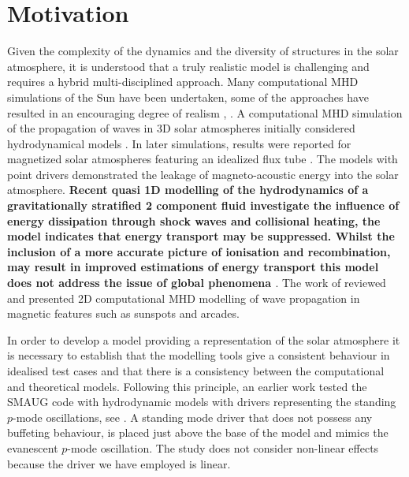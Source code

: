 \documentclass[physics,article,submit,pdftex,moreauthors]{Definitions/mdpi}
\begin{document}
\section{Motivation}
\label{sec:motivation}

Given the complexity of the dynamics and the diversity of structures in the solar atmosphere, it is understood that a truly realistic model is challenging and  requires a hybrid multi-disciplined approach. Many computational MHD simulations of the Sun have been undertaken, some of the approaches have resulted in an encouraging degree of realism  \cite{Vogler2005}, \cite{Gudiksen2011}. A computational MHD simulation of the propagation of waves in 3D solar atmospheres initially considered hydrodynamical models \cite{Fedun2009a}.  In later simulations, 
 results were reported for magnetized solar atmospheres featuring an idealized flux tube \cite{Fedun2009b} \cite{Vigeesh2012}. The models with point drivers demonstrated the leakage of magneto-acoustic energy into the solar atmosphere. {\bf Recent quasi 1D modelling of the hydrodynamics of a gravitationally stratified 2 component fluid investigate the influence of energy dissipation through shock waves and collisional heating, the model indicates that energy transport may be suppressed. Whilst the inclusion of a more accurate picture of ionisation and recombination, may result in improved estimations of energy transport this model does not address the issue of global phenomena \cite{Zhang2021}}.   The work of \cite{Khomenko2013} \cite{Santamaria2015} reviewed and presented 2D computational MHD modelling of wave propagation in magnetic features such as sunspots and arcades. 

In order to develop a model providing a representation of the solar atmosphere it is necessary to establish that the modelling tools give a consistent behaviour in idealised test cases and that there is a consistency between the computational and theoretical models.  Following this principle, an earlier work tested the SMAUG code with hydrodynamic models with drivers representing the standing $p$-mode oscillations, see \cite{Griffiths2018b}. A standing mode driver that does not possess any buffeting behaviour, is placed just above the base of the model and mimics the evanescent $p$-mode oscillation. The study does not consider non-linear effects because the driver we have employed is linear.


\end{document}
